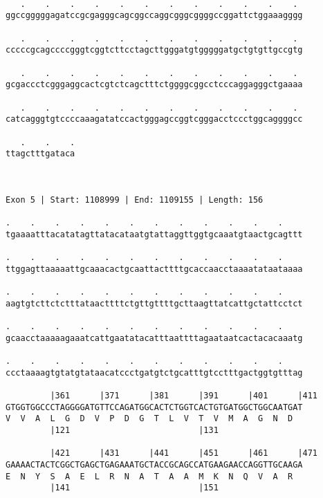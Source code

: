 \documentclass{article}
\begin{document}
\begin{Verbatim}
  
   .    .    .    .    .    .    .    .    .    .    .    . 
ggccgggggagatccgcgagggcagcggccaggcgggcggggccggattctggaaagggg
                                                            
   .    .    .    .    .    .    .    .    .    .    .    . 
cccccgcagccccgggtcggtcttcctagcttgggatgtgggggatgctgtgttgccgtg
                                                            
   .    .    .    .    .    .    .    .    .    .    .    . 
gcgaccctcgggaggcactcgtctcagctttctggggcggcctcccaggagggctgaaaa
                                                            
   .    .    .    .    .    .    .    .    .    .    .    . 
catcagggtgtccccaaagatatccactgggagccggtcgggacctccctggcaggggcc
                                                            
   .    .    .
ttagctttgataca
              
              
 
Exon 5 | Start: 1108999 | End: 1109155 | Length: 156
 
.    .    .    .    .    .    .    .    .    .    .    .    
tgaaaatttacatatagttatacataatgtattaggttggtgcaaatgtaactgcagttt
                                                            
.    .    .    .    .    .    .    .    .    .    .    .    
ttggagttaaaaattgcaaacactgcaattacttttgcaccaacctaaaatataataaaa
                                                            
.    .    .    .    .    .    .    .    .    .    .    .    
aagtgtcttctctttataacttttctgttgttttgcttaagttatcattgctattcctct
                                                            
.    .    .    .    .    .    .    .    .    .    .    .    
gcaacctaaaaagaaatcattgaatatacatttaattttagaataatcactacacaaatg
                                                            
.    .    .    .    .    .    .    .    .    .    .    .    
ccctaaaagtgtatgtataacatccctgatgtctgcatttgtcctttgactggtgtttag
                                                            
         |361      |371      |381      |391      |401      |411
GTGGTGGCCCTAGGGGATGTTCCAGATGGCACTCTGGTCACTGTGATGGCTGGCAATGAT
V  V  A  L  G  D  V  P  D  G  T  L  V  T  V  M  A  G  N  D  
         |121                          |131                 
  
         |421      |431      |441      |451      |461      |471
GAAAACTACTCGGCTGAGCTGAGAAATGCTACCGCAGCCATGAAGAACCAGGTTGCAAGA
E  N  Y  S  A  E  L  R  N  A  T  A  A  M  K  N  Q  V  A  R  
         |141                          |151                 
  

\end{Verbatim}
\end{document}
